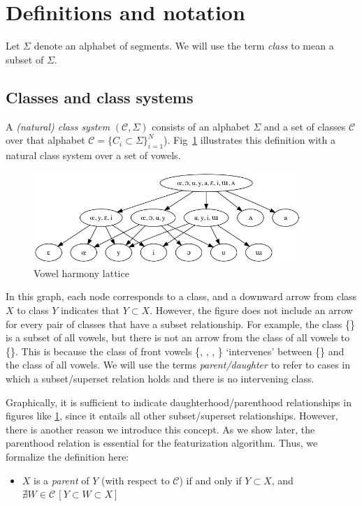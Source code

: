 \documentclass[11pt, oneside]{article}   	%
\begin{document}
\section{Definitions and notation}

Let $\Sigma$ denote an alphabet of segments. We will use the term \textit{class} to mean a subset of $\Sigma$.

\subsection{Classes and class systems}

A \textit{(natural) class system} $(\mathcal C, \Sigma)$ consists of an alphabet $\Sigma$ and a set of classes $\mathcal C$ over that alphabet $\mathcal C = \{ C_i \subset \Sigma \}_{i=1}^N$). Fig~\ref{fig:lattice} illustrates this definition with a natural class system over a set of vowels.

\begin{figure}[h]
\includegraphics[width=0.9\textwidth]{vowelHarmony_unicode.png}
\caption{Vowel harmony lattice}
\label{fig:lattice}
\end{figure}

In this graph, each node corresponds to a class, and a downward arrow from class $X$ to class $Y$ indicates that $Y \subset X$. However, the figure does not include an arrow for every pair of classes that have a subset relationship. For example, the class \{\} is a subset of all vowels, but there is not an arrow from the class of all vowels to \{\}. This is because the class of front vowels \{\textipa{\oe}, , , \} `intervenes' between \{\} and the class of all vowels. We will use the terms \textit{parent/daughter} to refer to cases in which a subset/superset relation holds and there is no intervening class.

Graphically, it is sufficient to indicate daughterhood/parenthood relationships in figures like \ref{fig:lattice}, since it entails all other subset/superset relationships. However, there is another reason we introduce this concept. As we show later, the parenthood relation is essential for the featurization algorithm. Thus, we formalize the definition here: \begin{itemize}
    \item $X$ is a \textit{parent} of $Y$ (with respect to $\mathcal C$) if and only if $Y \subset X$, and $\nexists W \in \mathcal C \, [Y \subset W \subset X]$
    \end{itemize}
\end{document}
